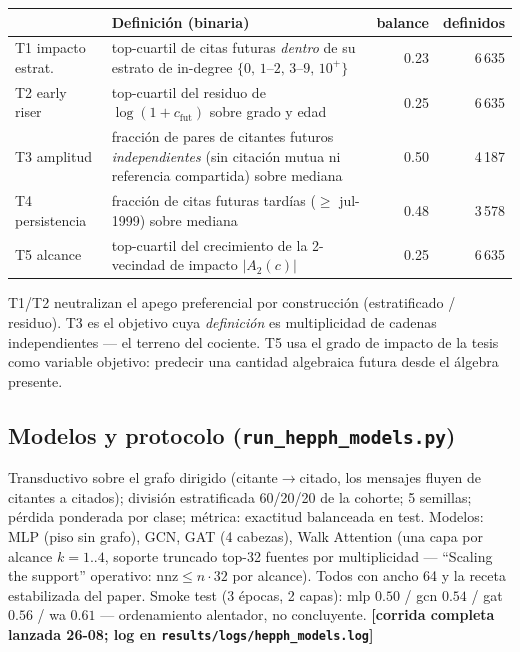 \documentclass[11pt]{article}
\newcommand{\estado}[1]{\textcolor{blue!60!black}{\textbf{[#1]}}}
\begin{document}
\begin{center}\small
\begin{tabular}{llrr}
\toprule
 & \textbf{Definici\'on (binaria)} & \textbf{balance} & \textbf{definidos}\\
\midrule
T1 impacto estrat. & top-cuartil de citas futuras \emph{dentro} de su
estrato de in-degree $\{0,\,1$--$2,\,3$--$9,\,10^{+}\}$ & 0.23 & 6\,635\\
T2 early riser & top-cuartil del residuo de $\log(1{+}c_{\text{fut}})$
sobre grado y edad & 0.25 & 6\,635\\
T3 amplitud & fracci\'on de pares de citantes futuros \emph{independientes}
(sin citaci\'on mutua ni referencia compartida) sobre mediana & 0.50 &
4\,187\\
T4 persistencia & fracci\'on de citas futuras tard\'ias ($\ge$ jul-1999)
sobre mediana & 0.48 & 3\,578\\
T5 alcance & top-cuartil del crecimiento de la 2-vecindad de impacto
$|A_2(c)|$ & 0.25 & 6\,635\\
\bottomrule
\end{tabular}
\end{center}

T1/T2 neutralizan el apego preferencial por construcci\'on (estratificado /
residuo). T3 es el objetivo cuya \emph{definici\'on} es multiplicidad de
cadenas independientes --- el terreno del cociente. T5 usa el grado de
impacto de la tesis como variable objetivo: predecir una cantidad
algebraica futura desde el \'algebra presente.

\subsection{Modelos y protocolo (\texttt{run\_hepph\_models.py})}

Transductivo sobre el grafo dirigido (citante$\to$citado, los mensajes
fluyen de citantes a citados); divisi\'on estratificada 60/20/20 de la
cohorte; 5 semillas; p\'erdida ponderada por clase; m\'etrica: exactitud
balanceada en test. Modelos: MLP (piso sin grafo), GCN, GAT (4 cabezas),
Walk Attention (una capa por alcance $k=1..4$, soporte truncado top-32
fuentes por multiplicidad --- ``Scaling the support'' operativo:
$\mathrm{nnz}\le n\cdot32$ por alcance). Todos con ancho 64 y la receta
estabilizada del paper. Smoke test (3 \'epocas, 2 capas):
mlp $0.50$ / gcn $0.54$ / gat $0.56$ / wa $0.61$ --- ordenamiento
alentador, no concluyente. \estado{corrida completa lanzada 26-08;
log en \texttt{results/logs/hepph\_models.log}}
\end{document}
